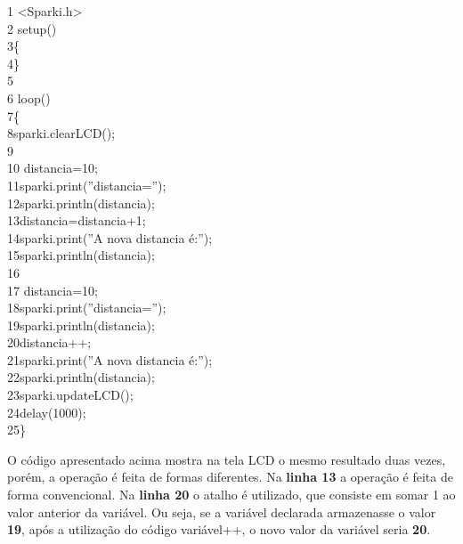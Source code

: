 \documentclass[conference]{IEEEtran}
\begin{document}
    {\selectfont 
    {\color{cinza}1} <Sparki.h>\\
    {\color{cinza}2} setup()\\
    {\color{cinza}3}\quad\{\\
    {\color{cinza}4}\quad\}\\
    {\color{cinza}5}\\
    {\color{cinza}6} loop()\\
    {\color{cinza}7}\quad\{\\
    {\color{cinza}8}\quad\quad sparki.clearLCD();\\
    {\color{cinza}9}\\
    {\color{cinza}10}\quad{} distancia=10;\\
    {\color{cinza}11}\quad\quad sparki.print({\color{verde}''distancia=''});\\
    {\color{cinza}12}\quad\quad sparki.println(distancia);\\
    {\color{cinza}13}\quad\quad distancia=distancia+1;\\
    {\color{cinza}14}\quad\quad sparki.print({\color{verde}''A nova distancia é:''});\\
    {\color{cinza}15}\quad\quad sparki.println(distancia);\\
    {\color{cinza}16}\\
    {\color{cinza}17}\quad{} distancia=10;\\
    {\color{cinza}18}\quad\quad sparki.print({\color{verde}''distancia=''});\\
    {\color{cinza}19}\quad\quad sparki.println(distancia);\\
    {\color{cinza}20}\quad\quad distancia++;\\
    {\color{cinza}21}\quad\quad sparki.print({\color{verde}''A nova distancia é:''});\\
    {\color{cinza}22}\quad\quad sparki.println(distancia);\\
    {\color{cinza}23}\quad\quad sparki.updateLCD();\\
    {\color{cinza}24}\quad\quad delay(1000);\\
    {\color{cinza}25}\quad\}}
    \\
    \par
    O código apresentado acima mostra na tela LCD o mesmo resultado duas vezes, porém, a operação é feita de formas diferentes. Na \textbf{linha 13} a operação é feita de forma convencional. Na {\textbf{linha 20}} o atalho {\selectfont {variável++}} é utilizado, que consiste em somar 1 ao valor anterior da variável. Ou seja, se a variável declarada armazenasse o valor {\textbf{19}}, após a utilização do código {\selectfont variável++}, o novo valor da variável seria {\textbf{20}}.
\end{document}
